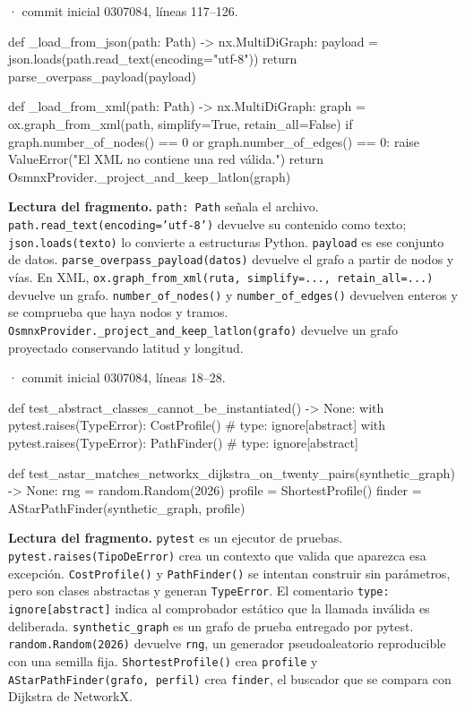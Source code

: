 \documentclass[11pt,a4paper]{article}
\begin{document}
\smallskip
{\footnotesize\texttt{} · commit inicial 0307084, líneas 117--126.}\par
\begin{Codigo}[firstnumber=117]
def _load_from_json(path: Path) -> nx.MultiDiGraph:
    payload = json.loads(path.read_text(encoding="utf-8"))
    return parse_overpass_payload(payload)


def _load_from_xml(path: Path) -> nx.MultiDiGraph:
    graph = ox.graph_from_xml(path, simplify=True, retain_all=False)
    if graph.number_of_nodes() == 0 or graph.number_of_edges() == 0:
        raise ValueError("El XML no contiene una red válida.")
    return OsmnxProvider._project_and_keep_latlon(graph)
\end{Codigo}

\textbf{Lectura del fragmento.} \texttt{path: Path} señala el archivo. \texttt{path.read\_text(encoding='utf-8')} devuelve su contenido como texto; \texttt{json.loads(texto)} lo convierte a estructuras Python. \texttt{payload} es ese conjunto de datos. \texttt{parse\_overpass\_payload(datos)} devuelve el grafo a partir de nodos y vías. En XML, \texttt{ox.graph\_from\_xml(ruta, simplify=..., retain\_all=...)} devuelve un grafo. \texttt{number\_of\_nodes()} y \texttt{number\_of\_edges()} devuelven enteros y se comprueba que haya nodos y tramos. \texttt{OsmnxProvider.\_project\_and\_keep\_latlon(grafo)} devuelve un grafo proyectado conservando latitud y longitud.


\smallskip
{\footnotesize\texttt{} · commit inicial 0307084, líneas 18--28.}\par
\begin{Codigo}[firstnumber=18]
def test_abstract_classes_cannot_be_instantiated() -> None:
    with pytest.raises(TypeError):
        CostProfile()  # type: ignore[abstract]
    with pytest.raises(TypeError):
        PathFinder()  # type: ignore[abstract]


def test_astar_matches_networkx_dijkstra_on_twenty_pairs(synthetic_graph) -> None:
    rng = random.Random(2026)
    profile = ShortestProfile()
    finder = AStarPathFinder(synthetic_graph, profile)
\end{Codigo}

\textbf{Lectura del fragmento.} \texttt{pytest} es un ejecutor de pruebas. \texttt{pytest.raises(TipoDeError)} crea un contexto que valida que aparezca esa excepción. \texttt{CostProfile()} y \texttt{PathFinder()} se intentan construir sin parámetros, pero son clases abstractas y generan \texttt{TypeError}. El comentario \texttt{type: ignore[abstract]} indica al comprobador estático que la llamada inválida es deliberada. \texttt{synthetic\_graph} es un grafo de prueba entregado por pytest. \texttt{random.Random(2026)} devuelve \texttt{rng}, un generador pseudoaleatorio reproducible con una semilla fija. \texttt{ShortestProfile()} crea \texttt{profile} y \texttt{AStarPathFinder(grafo, perfil)} crea \texttt{finder}, el buscador que se compara con Dijkstra de NetworkX.
\end{document}

